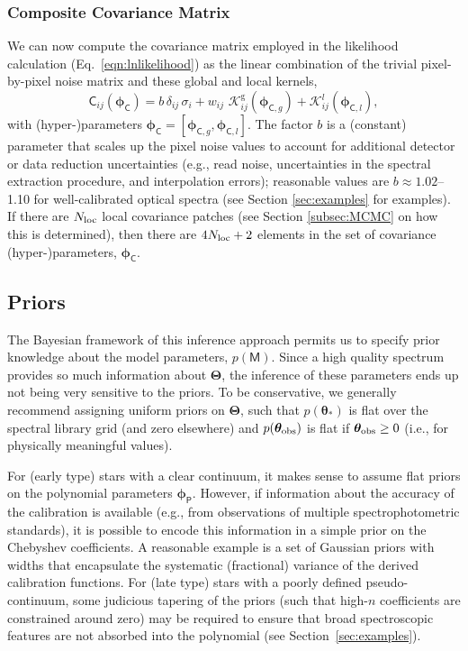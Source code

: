 \documentclass[iop,floatfix]{emulateapj}
\newcommand{\vM}{\mathsf{M}}
\newcommand{\vC}{\mathsf{C}}
\newcommand{\vt}{ {\bm \theta}}
\newcommand{\vT}{ {\bm \Theta}}
\newcommand{\vp}{ {\bm \phi}}
\newcommand{\cheb}{ \vp_{\mathsf{P}}}
\newcommand{\cov}{ \vp_{\mathsf{C}}}
\newcommand{\KK}{\mathcal{K}}
\newcommand{\Kglobal}{\KK^{\textrm{g}}}
\newcommand{\Klocal}{\KK^l}
\begin{document}
\subsubsection{Composite Covariance Matrix}

We can now compute the covariance matrix employed in the likelihood calculation 
(Eq.~\ref{eqn:lnlikelihood}) as the linear combination of the trivial pixel-by-pixel noise matrix 
and these global and local kernels, 
\begin{equation}
\vC_{ij}(\cov)  = b \, \delta_{ij} \, \sigma_i + w_{ij} \,\, \Kglobal_{ij}(\vp_{{\mathsf C}, g}) + 
                  \Klocal_{ij}(\vp_{{\mathsf C}, l}), 
\end{equation}
with (hyper-)parameters $\cov = [\vp_{{\mathsf C}, g}, \vp_{{\mathsf C}, l}]$.  The factor $b$ is 
a (constant) parameter that scales up the pixel noise values to account for additional detector or 
data reduction uncertainties (e.g., read noise, uncertainties in the spectral extraction procedure, 
and interpolation errors); reasonable values are $b \approx 1.02$--1.10 for well-calibrated optical 
spectra (see Section \ref{sec:examples} for examples).  If there are $N_{\rm loc}$ local covariance 
patches (see Section \ref{subsec:MCMC} on how this is determined), then there are $4N_{\rm loc}+2$ 
elements in the set of covariance (hyper-)parameters, $\cov$.  


\subsection{Priors} \label{subsec:priors}

The Bayesian framework of this inference approach permits us to specify prior knowledge about the 
model parameters, $p(\vM)$.  Since a high quality spectrum provides so much information about 
$\vT$, the inference of these parameters ends up not being very sensitive to the priors.  To be 
conservative, we generally recommend assigning uniform priors on $\vT$, such that $p(\vt_{\ast})$
is flat over the spectral library grid (and zero elsewhere) and $p(\vt_{\rm obs})$ is flat if 
$\vt_{\rm obs} \ge 0$ (i.e., for physically meaningful values).  

For (early type) stars with a clear continuum, it makes sense to assume flat priors on the 
polynomial parameters $\cheb$.  However, if information about the accuracy of the calibration is 
available (e.g., from observations of multiple spectrophotometric standards), it is possible to 
encode this information in a simple prior on the Chebyshev coefficients.  A reasonable example is a 
set of Gaussian priors with widths that encapsulate the systematic (fractional) variance of the 
derived calibration functions.  For (late type) stars with a poorly defined pseudo-continuum, 
some judicious tapering of the priors (such that high-$n$ coefficients are constrained around zero) 
may be required to ensure that broad spectroscopic features are not absorbed into the polynomial 
(see Section~\ref{sec:examples}). 
\end{document}
